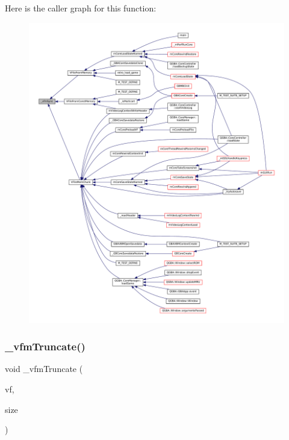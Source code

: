 Here is the caller graph for this function\+:
\nopagebreak
\begin{figure}[H]
\begin{center}
\leavevmode
\includegraphics[width=350pt]{vfs-mem_8c_a6d41b490b4553a84cae05c6fcc9cade3_icgraph}
\end{center}
\end{figure}
\mbox{\label{vfs-mem_8c_ab011a37762636847c8dcdecd850069a4}} 
\subsubsection{\texorpdfstring{\+\_\+vfm\+Truncate()}{\_vfmTruncate()}}
{\footnotesize\ttfamily void \+\_\+vfm\+Truncate (\begin{DoxyParamCaption}\item[{struct V\+File $\ast$}]{vf,  }\item[{size\+\_\+t}]{size }\end{DoxyParamCaption})\hspace{0.3cm}{\ttfamily [static]}}

